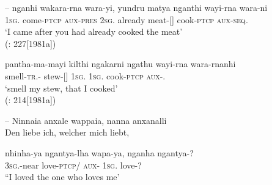 \documentclass{langscibook}
\begin{document}
\begin{xlist}
\begin{xlist}
\begin{xlist}
--
\ea\label{bkm:Ref339729473}
\gll nganhi        wakara-rna     wara-yi,     yundru     matya    nganthi            wayi-rna      wara-ni\\
1\textsc{sg}.   come-\textsc{ptcp}     \textsc{aux}-\textsc{pres}   2\textsc{sg}.   already   meat-[]  cook-\textsc{ptcp} \textsc{aux}-\textsc{seq}.\\
\glt  ‘I came after you had already cooked the meat’ \\
(\citealt{austin_grammar_2013}: 227[1981a])
\z

\ea
\label{bkm:Ref340480092}
\gll pantha-ma-mayi          kilthi               ngakarni     ngathu     wayi-rna    wara-rnanhi\\
smell-\textsc{tr}.-   stew-[]  1\textsc{sg}.    1\textsc{sg}.    cook-\textsc{ptcp}    \textsc{aux}-.\\
\glt `smell my stew, that I cooked' \\
(\citealt{austin_grammar_2013}: 214[1981a])
\z



--
\ea
   \label{bkm:Ref339729609}Ninnaia     anxale     wappaia,     nanna   anxanalli\\
    Den liebe ich, welcher mich liebt,\\

\citep{koch_untitled_1868}

 \gll nhinha-ya              ngantya-lha\footnotemark{} wapa-ya,        nganha       ngantya-?\\
    3\textsc{sg}.-near        love-\textsc{ptcp}/  \textsc{aux}-      1\textsc{sg}.        love-?\\
\glt    “I loved the one who loves me’
\z


\end{xlist}
\end{xlist}
\end{xlist}
\end{document}
